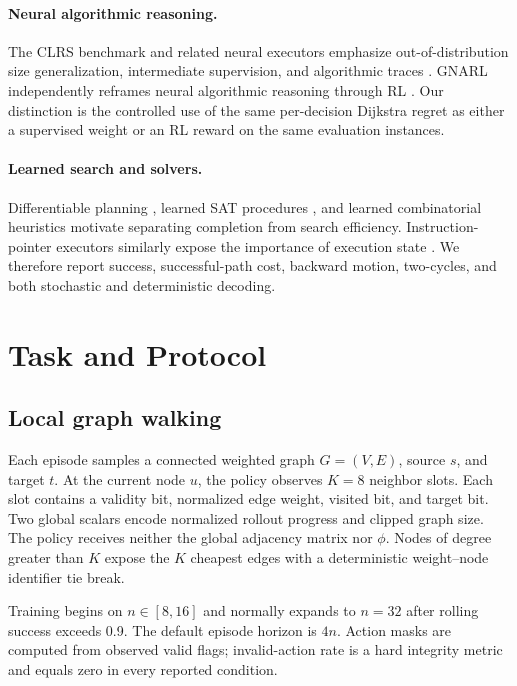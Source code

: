 \documentclass[10pt,twocolumn]{article}
\newcommand{\ph}{\phi}
\begin{document}
\paragraph{Neural algorithmic reasoning.}
The CLRS benchmark and related neural executors emphasize out-of-distribution
size generalization, intermediate supervision, and algorithmic traces
\citep{velickovic2020,velickovic2022,ibarz2022,bevilacqua2023,dudzik2022}.
GNARL independently reframes neural algorithmic reasoning through RL
\citep{schutz2025}.  Our distinction is the controlled use of the same
per-decision Dijkstra regret as either a supervised weight or an RL reward on
the same evaluation instances.

\paragraph{Learned search and solvers.}
Differentiable planning \citep{yonetani2021}, learned SAT procedures
\citep{yolcu2019,selsam2019}, and learned combinatorial heuristics
\citep{khalil2017} motivate separating completion from search efficiency.
Instruction-pointer executors similarly expose the importance of execution
state \citep{bieber2020}.  We therefore report success, successful-path cost,
backward motion, two-cycles, and both stochastic and deterministic decoding.

\section{Task and Protocol}
\label{sec:protocol}

\subsection{Local graph walking}

Each episode samples a connected weighted graph $G=(V,E)$, source $s$, and
target $t$.  At the current node $u$, the policy observes $K=8$ neighbor slots.
Each slot contains a validity bit, normalized edge weight, visited bit, and
target bit.  Two global scalars encode normalized rollout progress and clipped
graph size.  The policy receives neither the global adjacency matrix nor
$\ph$.  Nodes of degree greater than $K$ expose the $K$ cheapest edges with a
deterministic weight--node identifier tie break.

Training begins on $n\in[8,16]$ and normally expands to $n=32$ after rolling
success exceeds 0.9.  The default episode horizon is $4n$.  Action masks are
computed from observed valid flags; invalid-action rate is a hard integrity
metric and equals zero in every reported condition.
\end{document}
